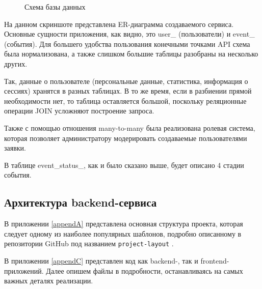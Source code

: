 \documentclass[diploma]{SCWorks}
\begin{document}
\begin{figure}[H]
	\caption{Схема базы данных}
	\label{pic:database}
\end{figure}

На данном скриншоте представлена ER-диаграмма создаваемого сервиса. Основные
сущности приложения, как видно, это user\_ (пользователи) и event\_ (события). 
Для большего удобства пользования конечными точками API схема была 
нормализована, а также слишком большие таблицы разобраны на несколько других.

Так, данные о пользователе (персональные данные, статистика, информация о 
сессиях) хранятся в разных таблицах. В то же время, если в разбиении 
прямой необходимости нет, то таблица оставляется
большой, поскольку реляционные операции JOIN усложняют построение запроса.

Также с помощью отношения many-to-many была реализована ролевая система, 
которая позволяет администратору модерировать создаваемые пользователями заявки.

В таблице event\_status\_, как и было сказано выше, будет описано 4 стадии 
события.

\subsection{Архитектура backend-сервиса}

В приложении \ref{appendA} представлена основная 
структура проекта, которая следует одному из наиболее популярных шаблонов, 
подробно описанному в репозитории GitHub под названием \texttt{project-layout} 
\cite{go-project-layout}.

В приложении \ref{appendC} представлен код как backend-, так и 
frontend-приложений. Далее опишем файлы в подробности, останавливаясь на самых 
важных деталях реализации.
\end{document}
